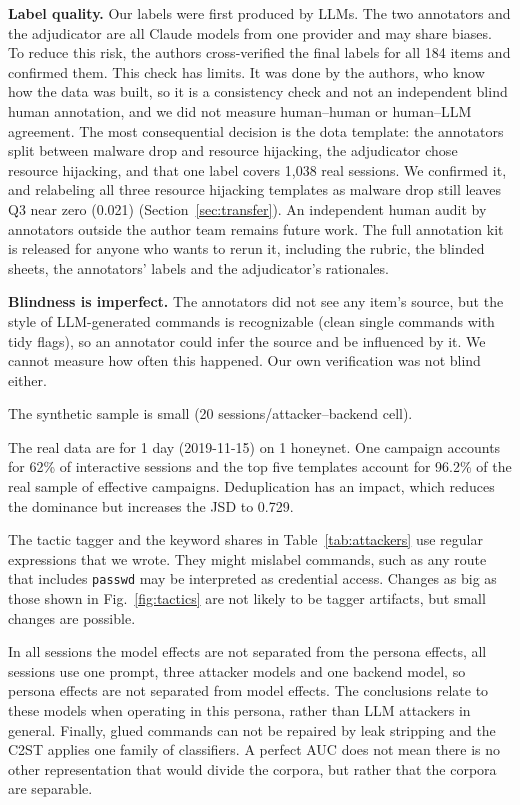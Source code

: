\documentclass[runningheads]{llncs}
\begin{document}
\textbf{Label quality.} Our labels were first produced by LLMs. The two annotators and the adjudicator are all Claude models from one provider and may share biases. To reduce this risk, the authors cross-verified the final labels for all 184 items and confirmed them. This check has limits. It was done by the authors, who know how the data was built, so it is a consistency check and not an independent blind human annotation, and we did not measure human--human or human--LLM agreement. The most consequential decision is the dota template: the annotators split between malware drop and resource hijacking, the adjudicator chose resource hijacking, and that one label covers 1,038 real sessions. We confirmed it, and relabeling all three resource hijacking templates as malware drop still leaves Q3 near zero (0.021) (Section~\ref{sec:transfer}). An independent human audit by annotators outside the author team remains future work. The full annotation kit is released for anyone who wants to rerun it, including the rubric, the blinded sheets, the annotators' labels and the adjudicator's rationales.

\textbf{Blindness is imperfect.} The annotators did not see any item's source, but the style of LLM-generated commands is recognizable (clean single commands with tidy flags), so an annotator could infer the source and be influenced by it. We cannot measure how often this happened. Our own verification was not blind either.

The synthetic sample is small (20 sessions/attacker--backend cell).

The real data are for 1 day (2019-11-15) on 1 honeynet. One campaign accounts for 62\% of interactive sessions and the top five templates account for 96.2\% of the real sample of effective campaigns. Deduplication has an impact, which reduces the dominance but increases the JSD to 0.729.

The tactic tagger and the keyword shares in Table~\ref{tab:attackers} use regular expressions that we wrote. They might mislabel commands, such as any route that includes \texttt{passwd} may be interpreted as credential access. Changes as big as those shown in Fig.~\ref{fig:tactics} are not likely to be tagger artifacts, but small changes are possible.

In all sessions the model effects are not separated from the persona effects, all sessions use one prompt, three attacker models and one backend model, so persona effects are not separated from model effects. The conclusions relate to these models when operating in this persona, rather than LLM attackers in general. Finally, glued commands can not be repaired by leak stripping and the C2ST applies one family of classifiers. A perfect AUC does not mean there is no other representation that would divide the corpora, but rather that the corpora are separable.
\end{document}
